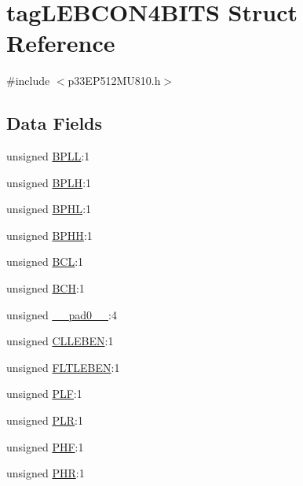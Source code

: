 \hypertarget{structtag_l_e_b_c_o_n4_b_i_t_s}{}\section{tag\+L\+E\+B\+C\+O\+N4\+B\+I\+TS Struct Reference}
\label{structtag_l_e_b_c_o_n4_b_i_t_s}


{\ttfamily \#include $<$p33\+E\+P512\+M\+U810.\+h$>$}

\subsection*{Data Fields}
\begin{DoxyCompactItemize}
\item 
unsigned \hyperlink{structtag_l_e_b_c_o_n4_b_i_t_s_a734b807d032fa494468c04783b84279d}{B\+P\+LL}\+:1
\item 
unsigned \hyperlink{structtag_l_e_b_c_o_n4_b_i_t_s_ab92bd28ed3161199870cae9dca9d8264}{B\+P\+LH}\+:1
\item 
unsigned \hyperlink{structtag_l_e_b_c_o_n4_b_i_t_s_ab1b78e048d280a836358a465b1670e7a}{B\+P\+HL}\+:1
\item 
unsigned \hyperlink{structtag_l_e_b_c_o_n4_b_i_t_s_a8fd804263987e931f779f124751138e1}{B\+P\+HH}\+:1
\item 
unsigned \hyperlink{structtag_l_e_b_c_o_n4_b_i_t_s_acead45594aa9d4a55a37f37fdcc3f0a0}{B\+CL}\+:1
\item 
unsigned \hyperlink{structtag_l_e_b_c_o_n4_b_i_t_s_a485d688549b456635ec3ac860ad7cdaf}{B\+CH}\+:1
\item 
unsigned \hyperlink{structtag_l_e_b_c_o_n4_b_i_t_s_adf71f3d8410c1f1dbbc96680a92c49af}{\+\_\+\+\_\+pad0\+\_\+\+\_\+}\+:4
\item 
unsigned \hyperlink{structtag_l_e_b_c_o_n4_b_i_t_s_a4ec62ac7ec38a6cf1ca2276db69912a9}{C\+L\+L\+E\+B\+EN}\+:1
\item 
unsigned \hyperlink{structtag_l_e_b_c_o_n4_b_i_t_s_aa96ca2430a7a6200927f390d1aa0b21a}{F\+L\+T\+L\+E\+B\+EN}\+:1
\item 
unsigned \hyperlink{structtag_l_e_b_c_o_n4_b_i_t_s_ab72be8b35e01107182afb8e9733d72bb}{P\+LF}\+:1
\item 
unsigned \hyperlink{structtag_l_e_b_c_o_n4_b_i_t_s_a5f690459b53fc81b46dbbac226cecb25}{P\+LR}\+:1
\item 
unsigned \hyperlink{structtag_l_e_b_c_o_n4_b_i_t_s_a4ac425e6c1575269dfa33a0373584fff}{P\+HF}\+:1
\item 
unsigned \hyperlink{structtag_l_e_b_c_o_n4_b_i_t_s_ae02a9c6926c3a1feac21cec18a520e4a}{P\+HR}\+:1
\end{DoxyCompactItemize}


